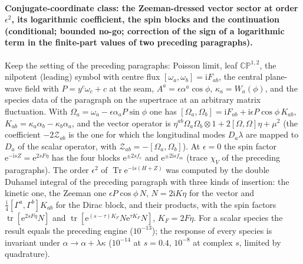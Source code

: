 \paragraph{Conjugate-coordinate class: the Zeeman-dressed vector sector at order \(\epsilon^2\), its logarithmic coefficient, the spin blocks and the continuation (conditional; bounded no-go; correction of the sign of a logarithmic term in the finite-part values of two preceding paragraphs).}
Keep the setting of the preceding paragraphs: Poisson limit, leaf \(\mathbb{CP}^{1,2}\), the nilpotent (leading) symbol with centre flux \([\omega_a,\omega_b]=\mathrm iF_{ab}\), the central plane-wave field with \(P=y^c\omega_c+c\) at the seam, \(A^a=\epsilon\alpha^a\cos\phi\), \(\kappa_a=W_a(\phi)\), and the species data of the paragraph on the supertrace at an arbitrary matrix fluctuation. With \(\Omega_a=\omega_a-\epsilon\alpha_aP\sin\phi\) one has \([\Omega_a,\Omega_b]=\mathrm iF_{ab}+\mathrm i\epsilon P\cos\phi\,K_{ab}\), \(K_{ab}=\kappa_a\alpha_b-\kappa_b\alpha_a\), and the vector operator is \(\eta^{ab}\Omega_a\Omega_b\otimes1+2[\Omega,\Omega]\eta+\mu^2\) (the coefficient \(-2\mathcal Z_{ab}\) is the one for which the longitudinal modes \(D_a\lambda\) are mapped to \(D_a\) of the scalar operator, with \(\mathcal Z_{ab}=-[\Omega_a,\Omega_b]\)). At \(\epsilon=0\) the spin factor \(\mathrm e^{-\mathrm is Z}=\mathrm e^{2sF\eta}\) has the four blocks \(\mathrm e^{\pm2sf_e}\) and \(\mathrm e^{\pm2\mathrm isf_m}\) (trace \(\chi_V\) of the preceding paragraphs). The order \(\epsilon^2\) of \(\operatorname{Tr}\mathrm e^{-\mathrm is(H+Z)}\) was computed by the double Duhamel integral of the preceding paragraph with three kinds of insertion: the kinetic one, the Zeeman one \(\epsilon P\cos\phi\,N\), \(N=2\mathrm iK\eta\) for the vector and \(\tfrac{\mathrm i}{4}[\Gamma^a,\Gamma^b]K_{ab}\) for the Dirac block, and their products, with the spin factors \(\operatorname{tr}[\mathrm e^{2sF\eta}N]\) and \(\operatorname{tr}[\mathrm e^{(s-\tau)K_F}N\mathrm e^{\tau K_F}N]\), \(K_F=2F\eta\). For a scalar species the result equals the preceding engine (\(10^{-13}\)); the response of every species is invariant under \(\alpha\to\alpha+\lambda\kappa\) (\(10^{-14}\) at \(s=0.4\), \(10^{-8}\) at complex \(s\), limited by quadrature).

